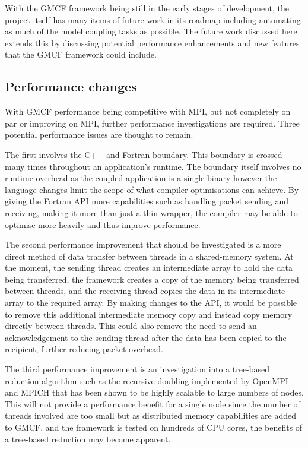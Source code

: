 With the GMCF framework being still in the early stages of development, the
project itself has many items of future work in its roadmap including automating
as much of the model coupling tasks as possible. The future work discussed here
extends this by discussing potential performance enhancements and new features
that the GMCF framework could include.

\subsection{Performance changes}

With GMCF performance being competitive with MPI, but not completely on par or
improving on MPI, further performance investigations are required. Three
potential performance issues are thought to remain.

The first involves the C++ and Fortran boundary. This boundary is crossed many
times throughout an application's runtime. The boundary itself involves no
runtime overhead as the coupled application is a single binary however the
language changes limit the scope of what compiler optimisations can achieve. By
giving the Fortran API more capabilities such as handling packet sending and
receiving, making it more than just a thin wrapper, the compiler may be able to
optimise more heavily and thus improve performance.

The second performance improvement that should be investigated is a more direct
method of data transfer between threads in a shared-memory system. At the
moment, the sending thread creates an intermediate array to hold the data being
transferred, the framework creates a copy of the memory being transferred
between threads, and the receiving thread copies the data in its intermediate
array to the required array. By making changes to the API, it would be possible
to remove this additional intermediate memory copy and instead copy memory
directly between threads. This could also remove the need to send an
acknowledgement to the sending thread after the data has been copied to the
recipient, further reducing packet overhead.

The third performance improvement is an investigation into a tree-based
reduction algorithm such as the recursive doubling implemented by OpenMPI and
MPICH that has been shown to be highly scalable to large numbers of
nodes\cite{Thakur2003}. This will not provide a performance benefit for a single
node since the number of threads involved are too small but as distributed
memory capabilities are added to GMCF, and the framework is tested on hundreds
of CPU cores, the benefits of a tree-based reduction may become apparent.

